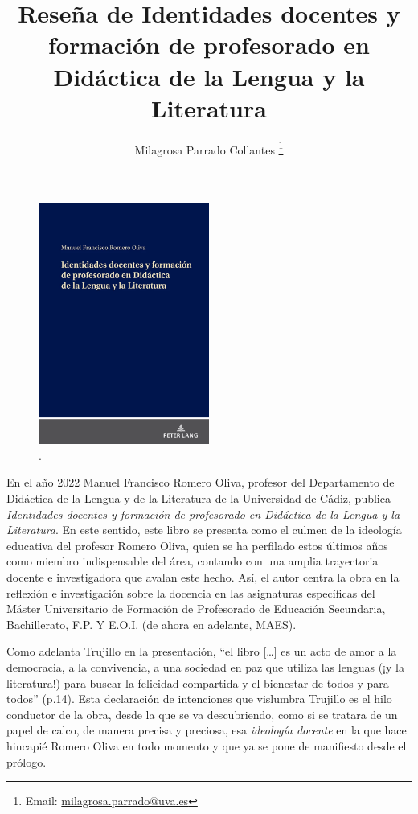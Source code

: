 \documentclass[spanish]{textolivre}
\title{Reseña de Identidades docentes y formación de profesorado en Didáctica de la Lengua y la Literatura}
\author[1]{Milagrosa Parrado Collantes \orcid{0000-0003-3250-496X} \thanks{Email: \href{mailto:milagrosa.parrado@uva.es}{milagrosa.parrado@uva.es}}}
\affil[1]{Universidad de Valladolid, Facultad: Facultad de Educación de Segovia, Departamento de Didáctica de la Lengua y la Literatura, Segovia, Castilla y León, España.}
\begin{document}
\maketitle


\begin{figure}[htbp]
 \centering
 \includegraphics[width=0.5\textwidth]{Fig1.png}
 \caption*{.}
 \label{fig01}
\end{figure}


En el año 2022 Manuel Francisco Romero Oliva, profesor del Departamento de Didáctica de la Lengua y de la Literatura de la Universidad de Cádiz, publica \textit{Identidades docentes y formación de profesorado en Didáctica de la Lengua y la Literatura}. En este sentido, este libro se presenta como el culmen de la ideología educativa del profesor Romero Oliva, quien se ha perfilado estos últimos años como miembro indispensable del área, contando con una amplia trayectoria docente e investigadora que avalan este hecho. Así, el autor centra la obra en la reflexión e investigación sobre la docencia en las asignaturas específicas del Máster Universitario de Formación de Profesorado de Educación Secundaria, Bachillerato, F.P. Y E.O.I. (de ahora en adelante, MAES).

Como adelanta Trujillo en la presentación, “el libro […] es un acto de amor a la democracia, a la convivencia, a una sociedad en paz que utiliza las lenguas (¡y la literatura!) para buscar la felicidad compartida y el bienestar de todos y para todos” (p.14).  Esta declaración de intenciones que vislumbra Trujillo es el hilo conductor de la obra, desde la que se va descubriendo, como si se tratara de un papel de calco, de manera precisa y preciosa, esa \textit{ideología docente} en la que hace hincapié Romero Oliva en todo momento y que ya se pone de manifiesto desde el prólogo.
\end{document}
